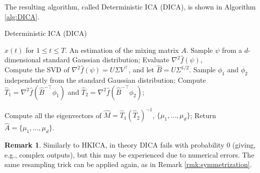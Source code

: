 \documentclass[jmlr]{article}
\newcommand{\Epsi}{\mathcal{E}_{\psi}}
\newcommand{\Ephi}{\mathcal{E}_{\phi}}
\newcommand{\cN}{\cal{N}}
\theoremstyle{definition}
\newtheorem{remark}[lemma]{Remark}
\begin{document}
The resulting algorithm, called Deterministic ICA (DICA), is shown in Algorithm \ref{alg:DICA}. 
\begin{algorithm}
\caption{Deterministic ICA (DICA)}
\label{alg:DICA}
\begin{algorithmic}[1]
\INPUT $x(t)$ for $1\le t \le T$. 
\OUTPUT An estimation of the mixing matrix $A$. 
\STATE Sample $\psi$ from a $d$-dimensional standard Gaussian distribution;
\STATE Evaluate $\nabla^2\hat{f}(\psi)$, \\
\STATE Compute the SVD of $\nabla^2\hat{f}(\psi) = U \Sigma V^{\top}$, and let $\hat{B} =  U \Sigma^{1/2}$.
\STATE Sample $\phi_1$ and $\phi_2$ independently from the standard Gaussian distribution;
\STATE Compute $\hat{T}_1 =\nabla^2\hat{f}(\hat{B}^{-\top}\phi_1)$ and  $\hat{T}_2 =\nabla^2\hat{f}(\hat{B}^{-\top}\phi_2)$;

\STATE Compute all the eigenvectors of $\hat{M} = \hat{T}_1\left(\hat{T}_2\right)^{-1}$, $\{\mu_1,\ldots,\mu_d\}$;
\STATE Return $\hat{A} = \{\mu_1,\ldots,\mu_d\}$.
\end{algorithmic}
\end{algorithm}
\begin{remark}
Similarly to HKICA, in theory DICA fails with probability 0 (giving, e.g., complex outputs), but this may be experienced due to numerical errors.
The same resampling trick can be applied again, as in Remark \ref{rmk:symmetrization}. 
\end{remark}
\end{document}
